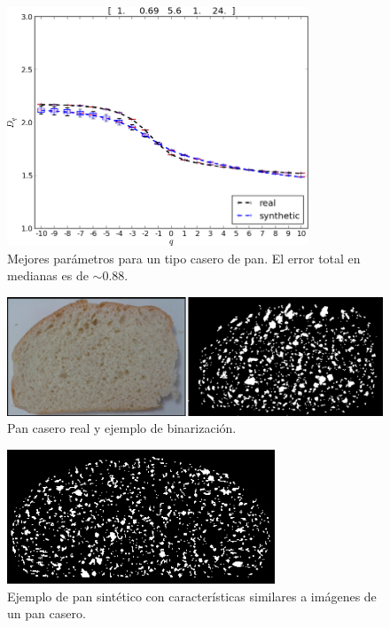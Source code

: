 \begin{figure}[!ht]
\includegraphics[width=9cm]{figures/bestboxplot2}
\caption[Mejores parámetros de síntesis para un tipo casero de pan]{Mejores parámetros para un tipo casero de pan. El error total en medianas es de $\sim 0.88$.}
\label{bestboxplot2}
\end{figure}

\begin{figure}[!ht]
\begin{center}
\includegraphics[width=13cm]{figures/realbin2}
\caption{ Pan casero real y ejemplo de binarización.}
\label{realbin2}
\end{center}
\end{figure}

\begin{figure}[!ht]
\begin{center}
\includegraphics[width=8cm]{figures/best2}
\caption{Ejemplo de pan sintético con características similares a imágenes de un pan casero.}
\label{best2}
\end{center}
\end{figure}


